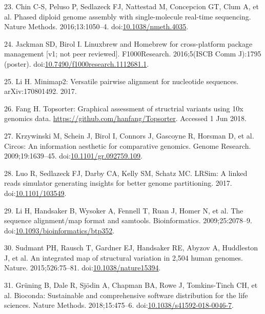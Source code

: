 \documentclass{bmcart}
\begin{document}
\begin{backmatter}
\leavevmode\hypertarget{ref-Chin_2016}{}%
23. Chin C-S, Peluso P, Sedlazeck FJ, Nattestad M, Concepcion GT, Clum A, et al. Phased diploid genome assembly with single-molecule real-time sequencing. Nature Methods. 2016;13:1050--4. doi:\href{https://doi.org/10.1038/nmeth.4035}{10.1038/nmeth.4035}.

\leavevmode\hypertarget{ref-Jackman_2016}{}%
24. Jackman SD, Birol I. Linuxbrew and Homebrew for cross-platform package management {[}v1; not peer reviewed{]}. F1000Research. 2016;5(ISCB Comm J):1795 (poster). doi:\href{https://doi.org/10.7490/f1000research.1112681.1}{10.7490/f1000research.1112681.1}.

\leavevmode\hypertarget{ref-Li_2017}{}%
25. Li H. Minimap2: Versatile pairwise alignment for nucleotide sequences. arXiv:170801492. 2017.

\leavevmode\hypertarget{ref-URL_JupiterPlot}{}%
26. Fang H. Topsorter: Graphical assessment of structrial variants using 10x genomics data. \url{https://github.com/hanfang/Topsorter}. Accessed 1 Jun 2018.

\leavevmode\hypertarget{ref-Krzywinski_2009}{}%
27. Krzywinski M, Schein J, Birol I, Connors J, Gascoyne R, Horsman D, et al. Circos: An information aesthetic for comparative genomics. Genome Research. 2009;19:1639--45. doi:\href{https://doi.org/10.1101/gr.092759.109}{10.1101/gr.092759.109}.

\leavevmode\hypertarget{ref-Luo_2017}{}%
28. Luo R, Sedlazeck FJ, Darby CA, Kelly SM, Schatz MC. LRSim: A linked reads simulator generating insights for better genome partitioning. 2017. doi:\href{https://doi.org/10.1101/103549}{10.1101/103549}.

\leavevmode\hypertarget{ref-Li_2009}{}%
29. Li H, Handsaker B, Wysoker A, Fennell T, Ruan J, Homer N, et al. The sequence alignment/map format and samtools. Bioinformatics. 2009;25:2078--9. doi:\href{https://doi.org/10.1093/bioinformatics/btp352}{10.1093/bioinformatics/btp352}.

\leavevmode\hypertarget{ref-Sudmant_2015}{}%
30. Sudmant PH, Rausch T, Gardner EJ, Handsaker RE, Abyzov A, Huddleston J, et al. An integrated map of structural variation in 2,504 human genomes. Nature. 2015;526:75--81. doi:\href{https://doi.org/10.1038/nature15394}{10.1038/nature15394}.

\leavevmode\hypertarget{ref-Gr_ning_2018}{}%
31. Grüning B, Dale R, Sjödin A, Chapman BA, Rowe J, Tomkins-Tinch CH, et al. Bioconda: Sustainable and comprehensive software distribution for the life sciences. Nature Methods. 2018;15:475--6. doi:\href{https://doi.org/10.1038/s41592-018-0046-7}{10.1038/s41592-018-0046-7}.

\end{backmatter}
\end{document}
